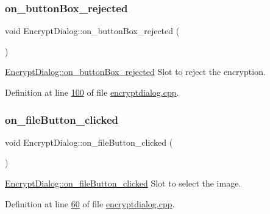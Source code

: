 \subsubsection{\texorpdfstring{on\+\_\+button\+Box\+\_\+rejected}{on\_buttonBox\_rejected}}
{\footnotesize\ttfamily void Encrypt\+Dialog\+::on\+\_\+button\+Box\+\_\+rejected (\begin{DoxyParamCaption}{ }\end{DoxyParamCaption})\hspace{0.3cm}{\ttfamily [slot]}}



\mbox{\hyperlink{class_encrypt_dialog_a43deb5fd2be501f4d03582a8ed49e9c2}{Encrypt\+Dialog\+::on\+\_\+button\+Box\+\_\+rejected}} Slot to reject the encryption. 



Definition at line \mbox{\hyperlink{encryptdialog_8cpp_source_l00100}{100}} of file \mbox{\hyperlink{encryptdialog_8cpp_source}{encryptdialog.\+cpp}}.

\mbox{\label{class_encrypt_dialog_ac9817d3f11f44f4bb8d97a228fbdf8a5}} 
\subsubsection{\texorpdfstring{on\+\_\+file\+Button\+\_\+clicked}{on\_fileButton\_clicked}}
{\footnotesize\ttfamily void Encrypt\+Dialog\+::on\+\_\+file\+Button\+\_\+clicked (\begin{DoxyParamCaption}{ }\end{DoxyParamCaption})\hspace{0.3cm}{\ttfamily [slot]}}



\mbox{\hyperlink{class_encrypt_dialog_ac9817d3f11f44f4bb8d97a228fbdf8a5}{Encrypt\+Dialog\+::on\+\_\+file\+Button\+\_\+clicked}} Slot to select the image. 



Definition at line \mbox{\hyperlink{encryptdialog_8cpp_source_l00060}{60}} of file \mbox{\hyperlink{encryptdialog_8cpp_source}{encryptdialog.\+cpp}}.

\mbox{\label{class_encrypt_dialog_a48c33063066fdbd61e2c87f08a5cfd60}} 
